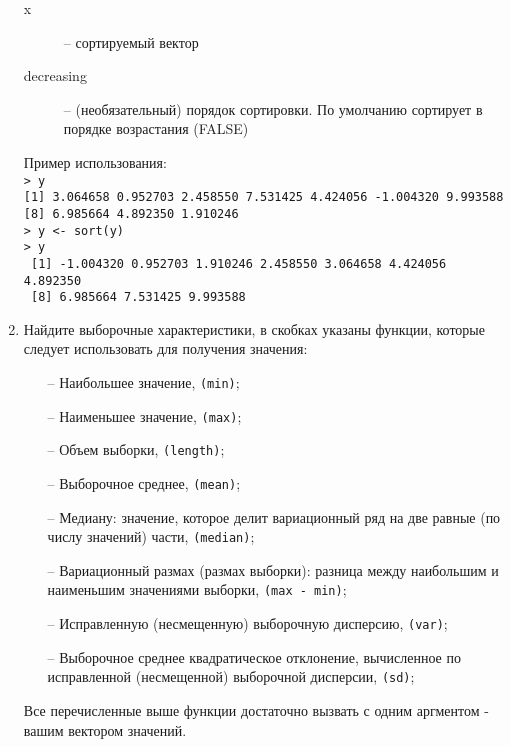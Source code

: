 \begin{enumerate}
\begin{mdframed}[style=BadassFrame]
\begin{description}
                \item[x] -- сортируемый вектор
                \item[decreasing] -- (необязательный) порядок сортировки. По умолчанию сортирует в 
                	порядке возрастания (FALSE)
              \end{description}
        \end{mdframed}

		Пример использования:\\
		\texttt{> y} \\
 		\texttt{[1]  3.064658  0.952703  2.458550  7.531425  4.424056 -1.004320  9.993588} \\
 		\texttt{[8]  6.985664  4.892350  1.910246} \\
        \texttt{> y <- sort(y)} \\
		\texttt{> y} \\
		\texttt{ [1] -1.004320  0.952703  1.910246  2.458550  3.064658  4.424056  4.892350} \\
		\texttt{ [8]  6.985664  7.531425  9.993588}

	\item Найдите выборочные характеристики, в скобках указаны функции, которые следует использовать для получения значения:
		\begin{itemize}
			\item[--] Наибольшее значение, \texttt{(min)};
			\item[--] Наименьшее значение, \texttt{(max)};
			\item[--] Объем выборки, \texttt{(length)};
			\item[--] Выборочное среднее, \texttt{(mean)};
			\item[--] Медиану: значение, которое делит вариационный ряд на две равные (по числу значений) части, \texttt{(median)};
			\item[--] Вариационный размах (размах выборки): разница между наибольшим и наименьшим значениями выборки, \texttt{(max - min)}; 
			\item[--] Исправленную (несмещенную) выборочную дисперсию, \texttt{(var)};
			\item[--] Выборочное среднее квадратическое отклонение, вычисленное по исправленной (несмещенной) выборочной дисперсии, \texttt{(sd)};
		\end{itemize}
		Все перечисленные выше функции достаточно вызвать с одним аргментом - вашим вектором значений.

        \begin{mdframed}[style=BadassFrame]


\end{mdframed}
\end{enumerate}
